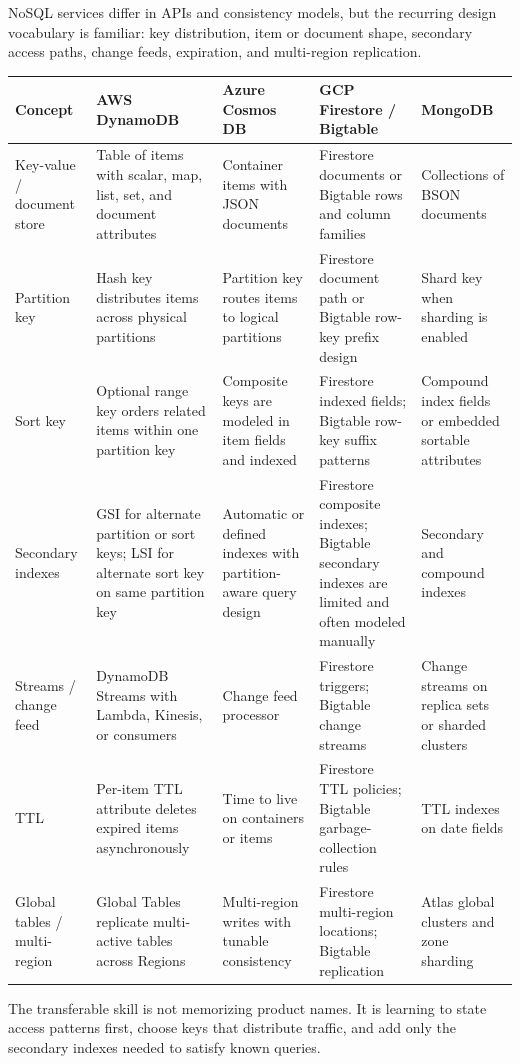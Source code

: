 \begin{crosscloud}
NoSQL services differ in APIs and consistency models, but the recurring design vocabulary is familiar: key distribution, item or document shape, secondary access paths, change feeds, expiration, and multi-region replication.
\vspace{2mm}
{\footnotesize
\begin{tabular}{@{}p{2.4cm}p{2.7cm}p{2.7cm}p{2.8cm}p{2.8cm}@{}}
\toprule
\textbf{Concept} & \textbf{AWS DynamoDB} & \textbf{Azure Cosmos DB} & \textbf{GCP Firestore / Bigtable} & \textbf{MongoDB} \\
\midrule
Key-value / document store & Table of items with scalar, map, list, set, and document attributes & Container items with JSON documents & Firestore documents or Bigtable rows and column families & Collections of BSON documents \\
Partition key & Hash key distributes items across physical partitions & Partition key routes items to logical partitions & Firestore document path or Bigtable row-key prefix design & Shard key when sharding is enabled \\
Sort key & Optional range key orders related items within one partition key & Composite keys are modeled in item fields and indexed & Firestore indexed fields; Bigtable row-key suffix patterns & Compound index fields or embedded sortable attributes \\
Secondary indexes & GSI for alternate partition or sort keys; LSI for alternate sort key on same partition key & Automatic or defined indexes with partition-aware query design & Firestore composite indexes; Bigtable secondary indexes are limited and often modeled manually & Secondary and compound indexes \\
Streams / change feed & DynamoDB Streams with Lambda, Kinesis, or consumers & Change feed processor & Firestore triggers; Bigtable change streams & Change streams on replica sets or sharded clusters \\
TTL & Per-item TTL attribute deletes expired items asynchronously & Time to live on containers or items & Firestore TTL policies; Bigtable garbage-collection rules & TTL indexes on date fields \\
Global tables / multi-region & Global Tables replicate multi-active tables across Regions & Multi-region writes with tunable consistency & Firestore multi-region locations; Bigtable replication & Atlas global clusters and zone sharding \\
\bottomrule
\end{tabular}}
\vspace{1mm}
The transferable skill is not memorizing product names. It is learning to state access patterns first, choose keys that distribute traffic, and add only the secondary indexes needed to satisfy known queries.
\end{crosscloud}
